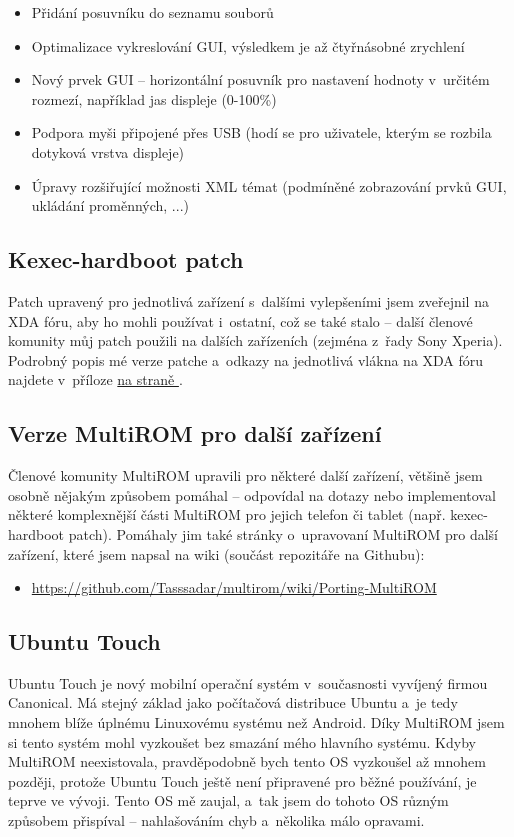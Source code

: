 \documentclass[12pt, a4paper, oneside]{article}
\newcommand*{\attref}[1]{\hyperref[{#1}]{\uv{\nameref*{#1}} na straně \pageref{#1}}}
\begin{document}
\begin{itemize}
    \item Přidání posuvníku do seznamu souborů
    \item Optimalizace vykreslování GUI, výsledkem je až čtyřnásobné zrychlení
    \item Nový prvek GUI -- horizontální posuvník pro nastavení hodnoty v~určitém rozmezí, například jas displeje (0-100\%)
    \item Podpora myši připojené přes USB (hodí se pro uživatele, kterým se rozbila dotyková vrstva displeje)
    \item Úpravy rozšiřující možnosti XML témat (podmíněné zobrazování prvků GUI, ukládání proměnných, ...)
\end{itemize}

\subsection{Kexec-hardboot patch}
Patch upravený pro jednotlivá zařízení s~dalšími vylepšeními jsem zveřejnil na XDA fóru, aby ho mohli používat i~ostatní, což se také stalo -- další členové komunity můj patch použili na dalších zařízeních (zejména z~řady Sony Xperia). Podrobný popis mé verze patche a~odkazy na jednotlivá vlákna na XDA fóru najdete v~příloze \attref{sec:kexec-hardboot}.

\subsection{Verze MultiROM pro další zařízení}
Členové komunity MultiROM upravili pro některé další zařízení, většině jsem osobně nějakým způsobem pomáhal -- odpovídal na dotazy nebo implementoval některé komplexnější části MultiROM pro jejich telefon či tablet (např. kexec-hardboot patch). Pomáhaly jim také stránky o~upravovaní MultiROM pro další zařízení, které jsem napsal na wiki (součást repozitáře na Githubu):

\begin{itemize}
    \item \url{https://github.com/Tasssadar/multirom/wiki/Porting-MultiROM}
\end{itemize}

\subsection{Ubuntu Touch}
Ubuntu Touch\cite{utouch} je nový mobilní operační systém v~současnosti vyvíjený firmou Canonical. Má stejný základ jako počítačová distribuce Ubuntu a~je tedy mnohem blíže úplnému Linuxovému systému než Android. Díky MultiROM jsem si tento systém mohl vyzkoušet bez smazání mého hlavního systému. Kdyby MultiROM neexistovala, pravděpodobně bych tento OS vyzkoušel až mnohem později, protože Ubuntu Touch ještě není připravené pro běžné používání, je teprve ve vývoji. Tento OS mě zaujal, a~tak jsem do tohoto OS různým způsobem přispíval -- nahlašováním chyb a~několika málo opravami.
\end{document}
